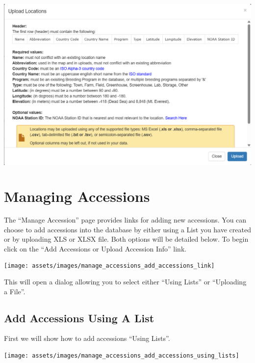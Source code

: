 \documentclass[
  12pt,
]{book}
\begin{document}
\begin{center}\includegraphics[width=0.95\linewidth]{assets/images/image187} \end{center}

\hypertarget{managing-accessions}{%
\chapter{Managing Accessions}\label{managing-accessions}}

The ``Manage Accession'' page provides links for adding new accessions. You can choose to add accessions into the database by either using a List you have created or by uploading XLS or XLSX file. Both options will be detailed below. To begin click on the ``Add Accessions or Upload Accession Info'' link.

\begin{center}\texttt{[image: assets/images/manage\_accessions\_add\_accessions\_link]} \end{center}

This will open a dialog allowing you to select either ``Using Lists'' or ``Uploading a File''.

\hypertarget{add-accessions-using-a-list}{%
\section{Add Accessions Using A List}\label{add-accessions-using-a-list}}

First we will show how to add accessions ``Using Lists''.

\begin{center}\texttt{[image: assets/images/manage\_accessions\_add\_accessions\_using\_lists]} \end{center}
\end{document}
